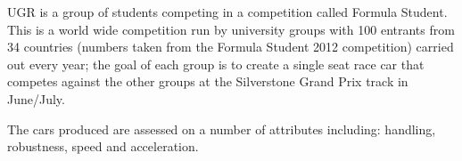 \label{BG}
UGR is a group of students competing in a competition called Formula Student. This is a world wide competition run by university groups with 100 entrants from 34 countries (numbers taken from the Formula Student 2012 competition) carried out every year; the goal of each group is to create a single seat race car that competes against the other groups at the Silverstone Grand Prix track in June/July. 

The cars produced are assessed on a number of attributes including: handling, robustness, speed and acceleration.
